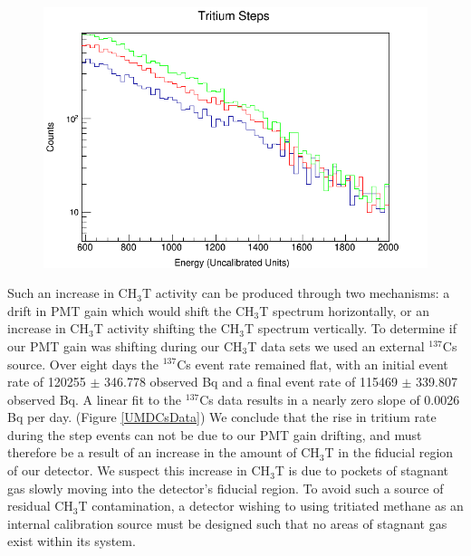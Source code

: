 \documentclass[a4paper,12pt]{article}
\begin{document}
{\begin{figure}
\includegraphics[scale=.35]{Steps_Overlay.png} 
\label{UMDOutgassingSpectra}
\end{figure}

Such an increase in CH$_3$T activity can be produced through two mechanisms: a drift in PMT gain which would shift the CH$_3$T spectrum horizontally, or an increase in CH$_3$T activity shifting the CH$_3$T spectrum vertically. To determine if our PMT gain was shifting during our CH$_3$T data sets we used an external $^{137}$Cs source. Over eight days the $^{137}$Cs event rate remained flat, with an initial event rate of 120255 $\pm$ 346.778 observed Bq and a final event rate of 115469 $\pm$ 339.807 observed Bq. A linear fit to the $^{137}$Cs data results in a nearly zero slope of 0.0026 Bq per day. (Figure \ref{UMDCsData}) We conclude that the rise in tritium rate during the step events can not be due to our PMT gain drifting, and must therefore be a result of an increase in the amount of CH$_3$T in the fiducial region of our detector. We suspect this increase in CH$_3$T is due to pockets of stagnant gas slowly moving into the detector's fiducial region. To avoid such a source of residual CH$_3$T contamination, a detector wishing to using tritiated methane as an internal calibration source must be designed such that no areas of stagnant gas exist within its system.  

}
\end{document}
